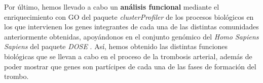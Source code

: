 Por último, hemos llevado a cabo un \textbf{análisis funcional} mediante el enriquecimiento con GO del paquete \textit{clusterProfiler} \cite{clusterProfiler} de los procesos biológicos en los que intervienen los genes integrantes de cada una de las distintas comunidades anteriormente obtenidas, apoyándonos en el conjunto genómico del \textit{Homo Sapiens Sapiens} del paquete \textit{DOSE} \cite{DOSE}.  Así, hemos obtenido las distintas funciones biológicas que se llevan a cabo en el proceso de la trombosis arterial, además de poder mostrar que genes son partícipes de cada una de las fases de formación del trombo.
